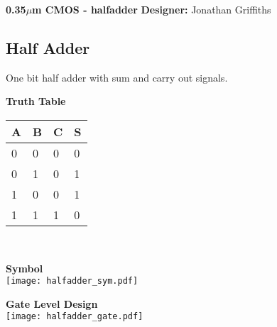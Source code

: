 \AddToShipoutPicture*{\BackgroundStructure} %


{\Large \textbf{0.35$\mu$m CMOS - {\textbf{halfadder}}} \hfill\textbf{Designer: } Jonathan Griffiths \\}

\subsection{Half Adder}

\parbox{.45\linewidth}{

One bit half adder with sum and carry out signals.


}
\hfill
\parbox{.45\linewidth}{
\begin{center}
\textbf{Truth Table}\\[0.2cm]

    \begin{tabular}{|ll|ll|}
    \hline
    A & B & C & S \\ \hline \hline
    0 & 0 & 0 & 0 \\
    0 & 1 & 0 & 1 \\
    1 & 0 & 0 & 1 \\
    1 & 1 & 1 & 0 \\ \hline
    \end{tabular}\\[0.5cm]

\end{center}
}

\vspace{1cm}

\parbox{.3\linewidth}{
\begin{center}
\textbf{Symbol}\\[0.2cm]

\texttt{[image: halfadder\_sym.pdf]}

\end{center}
}
\hfill
\parbox{.6\linewidth}{
\begin{center}
\textbf{Gate Level Design}\\[0.2cm]

\texttt{[image: halfadder\_gate.pdf]}

\end{center}
}

